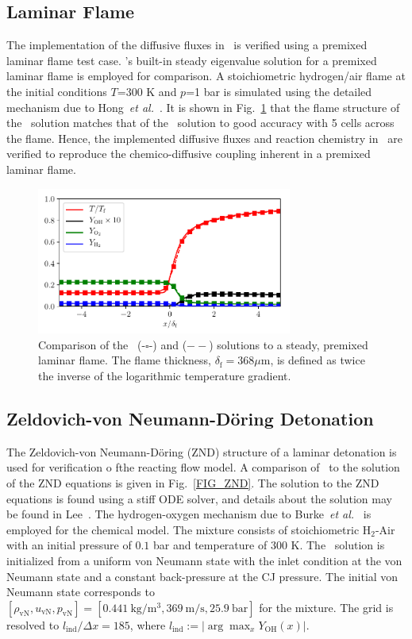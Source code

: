 \subsection{Laminar Flame}
The implementation of the diffusive fluxes in \stnshk\ is verified using a premixed laminar flame test case. \cantera's built-in steady eigenvalue solution for a premixed laminar flame is employed for comparison. A stoichiometric hydrogen/air flame at the initial conditions $T$=300 K and $p$=1 bar is simulated using the detailed mechanism due to Hong~\emph{et al.}~\cite{HONG_DAVIDSON_HANSON_CF11}. It is shown in Fig.~\ref{FIG_LF} that the flame structure of the \stnshk\ solution matches that of the \cantera\ solution to good accuracy with 5 cells across the flame. Hence, the implemented diffusive fluxes and reaction chemistry in \stnshk\ are verified to reproduce the chemico-diffusive coupling inherent in a premixed laminar flame. 
\begin{figure}[!ht!]
	\centering
	\includegraphics[width=84mm]{laminarFlame.pdf}
	\caption{\label{FIG_LF} Comparison of the \stnshk\ (-$\square$-) and \cantera ($--$) solutions to a steady, premixed laminar flame. The flame thickness, $\delta_\mathrm{f}=368\mu$m, is defined as twice the inverse of the logarithmic temperature gradient. }
\end{figure}
\subsection{Zeldovich-von Neumann-D\"oring Detonation}

The Zeldovich-von Neumann-D\"oring (ZND) structure of a laminar detonation  is used for verification o fthe reacting flow model. A comparison of \stnshk\ to the solution of the ZND equations is given in Fig.~\ref{FIG_ZND}. The solution to the ZND equations is found using a stiff ODE solver, and details about the solution may be found in Lee~\cite{LEE_BOOK2008}. The hydrogen-oxygen mechanism due to Burke~\emph{et al.}~\cite{BURKE_CHAOS_JU_DRYER_KLIPPENSTEIN_IJCK20112} is employed for the chemical model. The mixture consists of stoichiometric H$_2$-Air with an initial pressure of $0.1$ bar and temperature of 300 K. The \stnshk\ solution is initialized from a uniform von Neumann state with the inlet condition at the von Neumann state and a constant back-pressure at the CJ pressure. The initial von Neumann state corresponds to $[\rho_\mathrm{vN},u_\mathrm{vN},p_\mathrm{vN}]=[0.441\ \mathrm{kg/m^3}, 	369\ \mathrm{m/s},25.9\ \mathrm{bar}]$ for the mixture. The grid is resolved to $l_\mathrm{ind}/\Delta x=185$, where $l_\mathrm{ind}:=|\arg\max_{x}Y_\mathrm{OH}(x)|$. 

